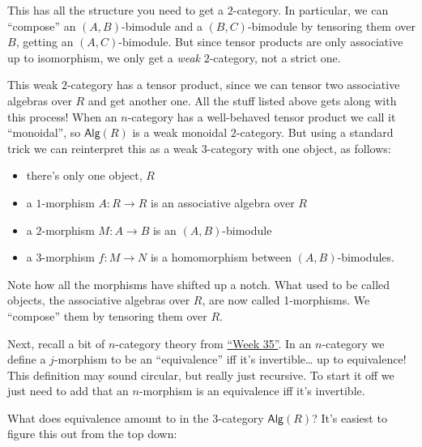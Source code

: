 \documentclass{article}
\def\tightlist{}
\begin{document}
This has all the structure you need to get a \(2\)-category. In
particular, we can ``compose'' an \((A,B)\)-bimodule and a
\((B,C)\)-bimodule by tensoring them over \(B\), getting an
\((A,C)\)-bimodule. But since tensor products are only associative up to
isomorphism, we only get a \emph{weak} \(2\)-category, not a strict one.

This weak \(2\)-category has a tensor product, since we can tensor two
associative algebras over \(R\) and get another one. All the stuff
listed above gets along with this process! When an \(n\)-category has a
well-behaved tensor product we call it ``monoidal'', so
\(\mathsf{Alg}(R)\) is a weak monoidal \(2\)-category. But using a
standard trick we can reinterpret this as a weak \(3\)-category with one
object, as follows:

\begin{itemize}
\tightlist
\item
  there's only one object, \(R\)
\item
  a \(1\)-morphism \(A\colon R \to R\) is an associative algebra over
  \(R\)
\item
  a \(2\)-morphism \(M\colon A \to B\) is an \((A,B)\)-bimodule
\item
  a \(3\)-morphism \(f\colon M \to N\) is a homomorphism between
  \((A,B)\)-bimodules.
\end{itemize}

Note how all the morphisms have shifted up a notch. What used to be
called objects, the associative algebras over \(R\), are now called
1-morphisms. We ``compose'' them by tensoring them over \(R\).

Next, recall a bit of \(n\)-category theory from
\protect\hyperlink{week35}{``Week 35''}. In an \(n\)-category we define
a \(j\)-morphism to be an ``equivalence'' iff it's invertible\ldots{} up
to equivalence! This definition may sound circular, but really just
recursive. To start it off we just need to add that an \(n\)-morphism is
an equivalence iff it's invertible.

What does equivalence amount to in the \(3\)-category
\(\mathsf{Alg}(R)\)? It's easiest to figure this out from the top down:
\end{document}
